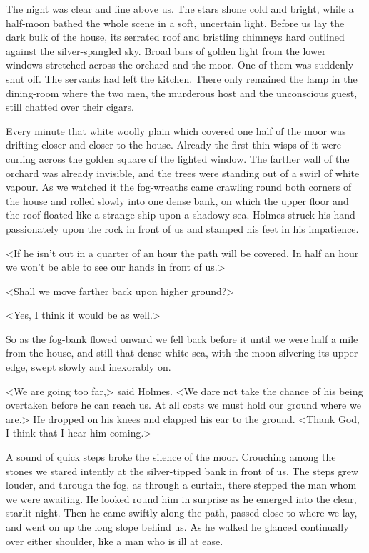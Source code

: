 The night was clear and fine above us. The stars shone cold and bright, while a half-moon bathed the whole scene in a soft, uncertain light. Before us lay the dark bulk of the house, its serrated roof and bristling chimneys hard outlined against the silver-spangled sky. Broad bars of golden light from the lower windows stretched across the orchard and the moor. One of them was suddenly shut off. The servants had left the kitchen. There only remained the lamp in the dining-room where the two men, the murderous host and the unconscious guest, still chatted over their cigars.

Every minute that white woolly plain which covered one half of the moor was drifting closer and closer to the house. Already the first thin wisps of it were curling across the golden square of the lighted window. The farther wall of the orchard was already invisible, and the trees were standing out of a swirl of white vapour. As we watched it the fog-wreaths came crawling round both corners of the house and rolled slowly into one dense bank, on which the upper floor and the roof floated like a strange ship upon a shadowy sea. Holmes struck his hand passionately upon the rock in front of us and stamped his feet in his impatience.



<If he isn't out in a quarter of an hour the path will be covered. In half an hour we won't be able to see our hands in front of us.>

<Shall we move farther back upon higher ground?>

<Yes, I think it would be as well.>

So as the fog-bank flowed onward we fell back before it until we were half a mile from the house, and still that dense white sea, with the moon silvering its upper edge, swept slowly and inexorably on.

<We are going too far,> said Holmes. <We dare not take the chance of his being overtaken before he can reach us. At all costs we must hold our ground where we are.> He dropped on his knees and clapped his ear to the ground. <Thank God, I think that I hear him coming.>

A sound of quick steps broke the silence of the moor. Crouching among the stones we stared intently at the silver-tipped bank in front of us. The steps grew louder, and through the fog, as through a curtain, there stepped the man whom we were awaiting. He looked round him in surprise as he emerged into the clear, starlit night. Then he came swiftly along the path, passed close to where we lay, and went on up the long slope behind us. As he walked he glanced continually over either shoulder, like a man who is ill at ease.


